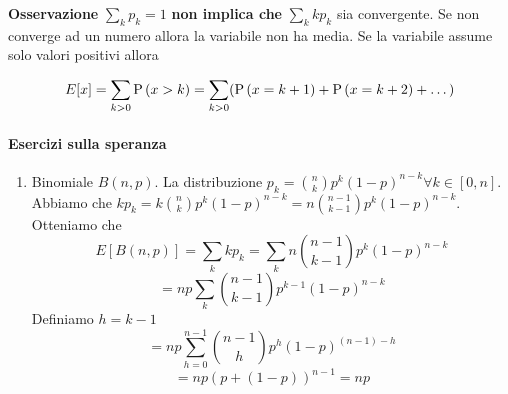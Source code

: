 \textbf{Osservazione} $\sum_{k} p_k = 1 $ \textbf{non implica che} $ \sum_{k} k p_k $ sia convergente. Se non converge ad un numero allora la variabile non ha media. Se la variabile assume solo valori positivi allora

\[  E[x] = \sum_{k>0} \text{P}\left(x > k\right) = \sum_{k>0} (\text{P}\left(x = k+1\right) + \text{P}\left(x = k+2\right) + \dots) \]

\paragraph{Esercizi sulla speranza}

\begin{enumerate}
	\item Binomiale $ B(n,p) $. La distribuzione $ p_k = \binom{n}{k}p^k(1-p)^{n-k}  \forall k \in [0,n] $. Abbiamo che $ kp_k = k \binom{n}{k}p^k (1-p)^{n-k} = n \binom{n-1}{k-1} p^k(1-p)^{n-k} $. Otteniamo che 
		\[ E[B(n,p)] = \sum_{k} kp_k = \sum_{k} n \binom{n-1}{k-1} p^k(1-p)^{n-k} \]
		\[ = np \sum_{k} \binom{n-1}{k-1}p^{k-1}(1-p)^{n-k} \]
		Definiamo $ h = k-1 $
		\[=  np \sum_{h=0}^{n-1} \binom{n-1}{h} p^h(1-p)^{(n-1) - h } \]
		\[ = np(p+(1-p))^{n-1} = np \]
\end{enumerate}
